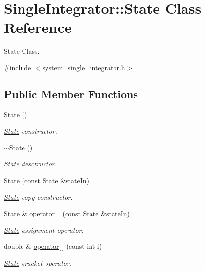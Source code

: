 \hypertarget{class_single_integrator_1_1_state}{\section{Single\-Integrator\-:\-:State Class Reference}
\label{class_single_integrator_1_1_state}
}


\hyperlink{class_single_integrator_1_1_state}{State} Class.  




{\ttfamily \#include $<$system\-\_\-single\-\_\-integrator.\-h$>$}

\subsection*{Public Member Functions}
\begin{DoxyCompactItemize}
\item 
\hyperlink{class_single_integrator_1_1_state_ab91bb1dd5aa6260ab2a456581daf9ec2}{State} ()
\begin{DoxyCompactList}\small\item\em \hyperlink{class_single_integrator_1_1_state}{State} constructor. \end{DoxyCompactList}\item 
\hyperlink{class_single_integrator_1_1_state_afab438d92b90dc18d194dbd9c9c8bab3}{$\sim$\-State} ()
\begin{DoxyCompactList}\small\item\em \hyperlink{class_single_integrator_1_1_state}{State} desctructor. \end{DoxyCompactList}\item 
\hyperlink{class_single_integrator_1_1_state_a9972c9875845bf16a1fd9559ad7f8c70}{State} (const \hyperlink{class_single_integrator_1_1_state}{State} \&state\-In)
\begin{DoxyCompactList}\small\item\em \hyperlink{class_single_integrator_1_1_state}{State} copy constructor. \end{DoxyCompactList}\item 
\hyperlink{class_single_integrator_1_1_state}{State} \& \hyperlink{class_single_integrator_1_1_state_a04b3ac29a9d88cc97f2a58060da01c58}{operator=} (const \hyperlink{class_single_integrator_1_1_state}{State} \&state\-In)
\begin{DoxyCompactList}\small\item\em \hyperlink{class_single_integrator_1_1_state}{State} assignment operator. \end{DoxyCompactList}\item 
double \& \hyperlink{class_single_integrator_1_1_state_aad1437e4bf9c87b528b616445734fda2}{operator\mbox{[}$\,$\mbox{]}} (const int i)
\begin{DoxyCompactList}\small\item\em \hyperlink{class_single_integrator_1_1_state}{State} bracket operator. \end{DoxyCompactList}\end{DoxyCompactItemize}
